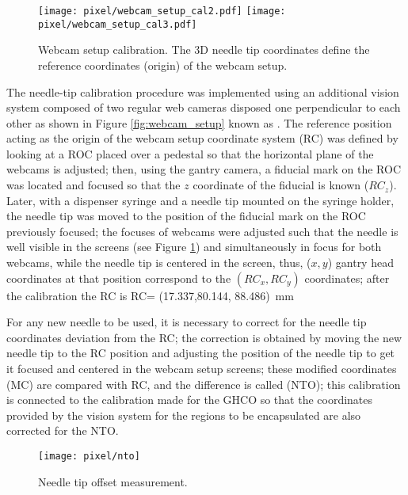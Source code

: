 \begin{figure}[h]
  \begin{center}
    \texttt{[image: pixel/webcam\_setup\_cal2.pdf]}
    \texttt{[image: pixel/webcam\_setup\_cal3.pdf]}\\
    \caption[Webcam setup calibration.]{Webcam setup calibration. The 3D needle tip coordinates define the reference coordinates (origin) of the webcam setup.}\label{fig:webcam_cal}
  \end{center}
\end{figure}

The needle-tip calibration procedure was implemented using an additional vision system composed of two regular web cameras disposed one perpendicular to each other as shown in Figure \ref{fig:webcam_setup} known as . The reference position acting as the origin of the webcam setup coordinate system (RC) was defined by looking at a ROC placed over a pedestal so that the horizontal plane of the webcams is adjusted; then, using the gantry camera, a fiducial mark on the ROC was located and focused so that the $z$ coordinate of the fiducial is known ($RC_z$). Later, with a dispenser syringe and a needle tip mounted on the syringe holder, the needle tip was moved to the position of the fiducial mark on the ROC previously focused; the focuses of webcams were adjusted such that the needle is well visible in the screens (see Figure \ref{fig:webcam_cal}) and simultaneously in focus for both webcams, while the needle tip is centered in the screen, thus, ($x,y$) gantry head coordinates at that position correspond to the $(RC_x, RC_y)$ coordinates; after the calibration the RC is
\beqn 
  RC= (17.337,80.144, 88.486)\ mm
\eeqn

For any new needle to be used, it is necessary to correct for the needle tip coordinates deviation from the RC; the correction is obtained by moving the new needle tip to the RC position and adjusting the position of the needle tip to get it focused and centered in the webcam setup screens; these modified coordinates (MC) are compared with RC, and the difference is called  (NTO); this calibration is connected to the calibration made for the GHCO so that the coordinates provided by the vision system for the regions to be encapsulated are also corrected for the NTO.              

\begin{figure}[h]
  \begin{center}
  \texttt{[image: pixel/nto]}
  \caption[Needle tip offset measurement.]{Needle tip offset measurement.}\label{fig:webcam_adjust}
  \end{center}
\end{figure}

